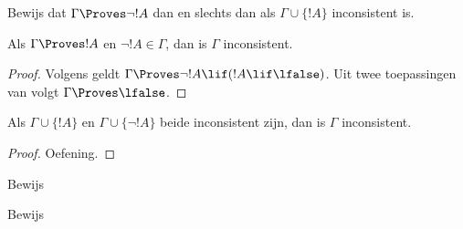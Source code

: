 \documentclass[openany]{memoir}
\begin{document}
\begin{prob}
Bewijs dat $\Gamma \Proves \lnot !A$ dan en slechts dan als $\Gamma
\cup \{!A\}$ inconsistent is.
\end{prob}

\begin{prop}
  Als $\Gamma \Proves !A$ en $\lnot !A \in \Gamma$, dan is $\Gamma$
  inconsistent.
\end{prop}

\begin{proof}
  Volgens  geldt $\Gamma \Proves \lnot !A \lif
  (!A \lif \lfalse)$. Uit twee toepassingen van
   volgt $\Gamma \Proves \lfalse$.
\end{proof}


\begin{prop}
  Als $\Gamma \cup \{!A\}$ en $\Gamma \cup \{\lnot !A\}$ beide
  inconsistent zijn, dan is $\Gamma$ inconsistent.
\end{prop}

\begin{proof}
Oefening.
\end{proof}

\begin{prob}
  Bewijs 
\end{prob}
\tagendprob

\begin{prob}
  Bewijs 
\end{prob}
\tagendprob
\endgroup

\begingroup
\def\olfilename{OLP-0122}
\def\olfilepath{content/first-order-logic/axiomatic-deduction/}
\hypertarget{unit-OLP-0122}{}



      {}
      {}

\end{document}
